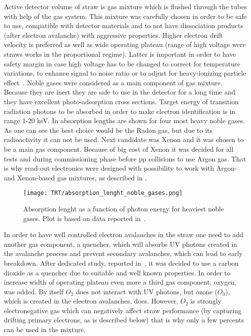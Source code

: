 Active detector volume of straw is gas mixture which is flushed through the tubes with help of the gas system.
This mixture was carefully chosen in order to be safe to use, compatible with detector materials and to not have dissociation products (after electron avalanche) 
with aggressive properties.
Higher electron drift velocity is preferred as well as wide operating plateau (range of high voltage were straws works in the proportional regime). 
Latter is important in order to have 
safety margin in case high voltage has to be changed to correct for temperature variations, to enhance signal to noise ratio or to adjust for 
heavy-ionizing particle effect~\cite{Abat:2008zza}.
Noble gases were considered as a main component of gas mixture. Because they are inert they are safe to use in the detector for a long time and they have 
excellent photo-adsorption cross sections.
Target energy of transition radiation photons to be absorbed in order to make electron identification is in range 1-20 keV.
In  absorption lengths are shown for four most heavy noble gases.
As one can see the best choice would be the Radon gas, but due to its radioactivity it can not be used.
Next candidate was Xenon and it was chosen to be a main gas component.
Because of big cost of Xenon it was decided for all tests and during commissioning phase before pp collisions to use Argon gas. That is why read-out electronics were
designed with possibility to work with Argon- and Xenon-based gas mixtures, as described in .

\begin{figure}
\centering
\texttt{[image: TRT/absorption\_lenght\_noble\_gases.png]}
\caption{ 
  Absorption lenght as a function of photon energy for heaviest noble gases. Plot is based on data reported in~\cite{Hubbell:353989}.
}
\label{fig:absorption_lenght}
\end{figure}

In order to have well controlled electron avalanches in the straw one need to add another gas component, a quencher, 
which will absorbs UV photons created in the avalanche process and prevent secondary avalanches, which can lead to early breakdown.
After dedicated study, reported in~\cite{Abat:2008zza}, it was decided to use a carbon dioxide as a quencher due to suitable and well known properties.
In order to increase width of operating plateau even more a third gas component, oxygen, was added.
By itself $O_2$ does not interact with UV photons, but ozone ($O_3$), which is created in the electron avalanches, does.
However, $O_2$ is strongly electronegative gas which can negatively affect straw performance (by capturing drifting primary electrons, as is described below)
that is why only a few percents can be used in the mixture.
 
